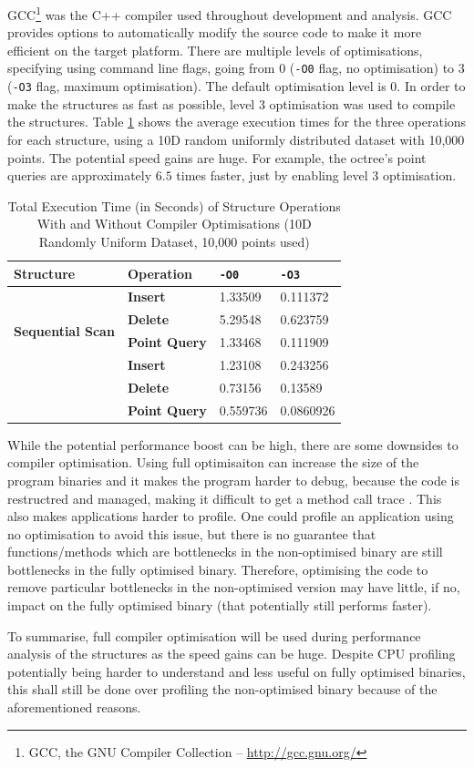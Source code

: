 GCC\footnote{GCC, the GNU Compiler Collection -- \url{http://gcc.gnu.org/}} was the C++ compiler used throughout development and analysis. GCC provides options to automatically modify the source code to make it more efficient on the target platform. There are multiple levels of optimisations, specifying using command line flags, going from 0 (\texttt{-O0} flag, no optimisation) to 3 (\texttt{-O3} flag, maximum optimisation). The default optimisation level is 0. In order to make the structures as fast as possible, level 3 optimisation was used to compile the structures. Table \ref{tab:compiler-optimisation} shows the average execution times for the three operations for each structure, using a 10D random uniformly distributed dataset with 10,000 points. The potential speed gains are huge. For example, the octree's point queries are approximately $6.5$ times faster, just by enabling level 3 optimisation.

\begin{table}
	\centering
	\begin{tabular}{|l|l|l|l|}
		\hline
		\textbf{Structure} & \textbf{Operation} & \texttt{-O0} & \texttt{-O3} \\
		\hline
		\multirow{ 4}{*}{\textbf{Sequential Scan}} & \textbf{Insert} & 1.33509 & 0.111372 \\
		 & \textbf{Delete} & 5.29548 & 0.623759 \\
		 & \textbf{Point Query} & 1.33468 & 0.111909 \\
		\hline
		\multirow{ 4}{*}{\textbf{Octree}} & \textbf{Insert} & 1.23108 & 0.243256 \\
		 & \textbf{Delete} & 0.73156 & 0.13589 \\
		 & \textbf{Point Query} & 0.559736 & 0.0860926 \\
		 \hline
	\end{tabular}
	\caption{Total Execution Time (in Seconds) of Structure Operations With and Without Compiler Optimisations (10D Randomly Uniform  Dataset, 10,000 points used)}
	\label{tab:compiler-optimisation}
\end{table}

While the potential performance boost can be high, there are some downsides to compiler optimisation. Using full optimisaiton can increase the size of the program binaries and it makes the program harder to debug, because the code is restructred and managed, making it difficult to get a method call trace \cite{gcc}. This also makes applications harder to profile. One could profile an application using no optimisation to avoid this issue, but there is no guarantee that functions/methods which are bottlenecks in the non-optimised binary are still bottlenecks in the fully optimised binary. Therefore, optimising the code to remove particular bottlenecks in the non-optimised version may have little, if no, impact on the fully optimised binary (that potentially still performs faster).

To summarise, full compiler optimisation will be used during performance analysis of the structures as the speed gains can be huge. Despite CPU profiling potentially being harder to understand and less useful on fully optimised binaries, this shall still be done over profiling the non-optimised binary because of the aforementioned reasons.